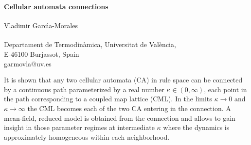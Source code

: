 \documentclass[aps,pre,preprint,floatfix]{revtex4}
\theoremstyle{plain} \newtheorem{defi}{Definition}[section]
\theoremstyle{plain} \newtheorem{prop}{Proposition}[section]
\theoremstyle{plain} \newtheorem{theor}{Theorem}[section]
\theoremstyle{plain} \newtheorem{lemma}{Lemma}[section]
\theoremstyle{plain} \newtheorem*{corol}{Corollary}
\theoremstyle{remark} \newtheorem*{rem}{Remark}
\theoremstyle{plain} \newtheorem{exer}{Exercise}[section]
\theoremstyle{remark} \newtheorem*{ans}{Answer}
\begin{document}
\begin{center}
\Large{\textbf{Cellular automata connections}}\\ 
~\\

\large{Vladimir Garc\'{\i}a-Morales}\\

\normalsize{}
~\\

Departament de Termodin\`amica, Universitat de Val\`encia, \\ E-46100 Burjassot, Spain
\\ garmovla@uv.es
\end{center}
\small{It is shown that any two cellular automata (CA) in rule space can be connected by a continuous path parameterized by a real number $\kappa \in (0, \infty)$, each point in the path corresponding to a coupled map lattice (CML). In the limits $\kappa \to 0$ and $\kappa \to \infty$ the CML becomes each of the two CA entering in the connection. A mean-field, reduced model is obtained from the connection and allows to gain insight in those parameter regimes at intermediate $\kappa$ where the dynamics is approximately homogeneous within each neighborhood.}
\noindent  
~\\

\pagebreak


\end{document}

